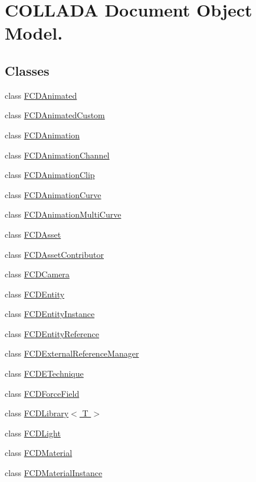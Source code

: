 \hypertarget{group__FCDocument}{
\section{COLLADA Document Object Model.}
\label{group__FCDocument}
}
\subsection*{Classes}
\begin{DoxyCompactItemize}
\item 
class \hyperlink{classFCDAnimated}{FCDAnimated}
\item 
class \hyperlink{classFCDAnimatedCustom}{FCDAnimatedCustom}
\item 
class \hyperlink{classFCDAnimation}{FCDAnimation}
\item 
class \hyperlink{classFCDAnimationChannel}{FCDAnimationChannel}
\item 
class \hyperlink{classFCDAnimationClip}{FCDAnimationClip}
\item 
class \hyperlink{classFCDAnimationCurve}{FCDAnimationCurve}
\item 
class \hyperlink{classFCDAnimationMultiCurve}{FCDAnimationMultiCurve}
\item 
class \hyperlink{classFCDAsset}{FCDAsset}
\item 
class \hyperlink{classFCDAssetContributor}{FCDAssetContributor}
\item 
class \hyperlink{classFCDCamera}{FCDCamera}
\item 
class \hyperlink{classFCDEntity}{FCDEntity}
\item 
class \hyperlink{classFCDEntityInstance}{FCDEntityInstance}
\item 
class \hyperlink{classFCDEntityReference}{FCDEntityReference}
\item 
class \hyperlink{classFCDExternalReferenceManager}{FCDExternalReferenceManager}
\item 
class \hyperlink{classFCDETechnique}{FCDETechnique}
\item 
class \hyperlink{classFCDForceField}{FCDForceField}
\item 
class \hyperlink{classFCDLibrary}{FCDLibrary$<$ T $>$}
\item 
class \hyperlink{classFCDLight}{FCDLight}
\item 
class \hyperlink{classFCDMaterial}{FCDMaterial}
\item 
class \hyperlink{classFCDMaterialInstance}{FCDMaterialInstance}

\end{DoxyCompactItemize}
